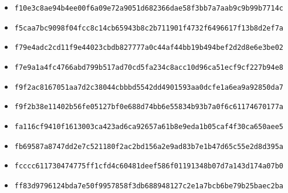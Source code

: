 {\begin{itemize}
    \item \texttt{f10e3c8ae94b4ee00f6a09e72a9051d682366dae58f3bb7a7aab9c9b99b7714c}
    \item \texttt{f5caa7bc9098f04fcc8c14cb65943b8c2b711901f4732f6496617f13b8d2ef7a}
    \item \texttt{f79e4adc2cd11f9e44023cbdb827777a0c44af44bb19b494bef2d2d8e6e3be02}
    \item \texttt{f7e9a1a4fc4766abd799b517ad70cd5fa234c8acc10d96ca51ecf9cf227b94e8}
    \item \texttt{f9f2ac8167051aa7d2c38044cbbbd5542dd4901593aa0dcfe1a6ea9a92850da7}
    \item \texttt{f9f2b38e11402b56fe05127bf0e688d74bb6e55834b93b7a0f6c61174670177a}
    \item \texttt{fa116cf9410f1613003ca423ad6ca92657a61b8e9eda1b05caf4f30ca650aee5}
    \item \texttt{fb69587a8747dd2e7c521180f2ac2bd156a2e9ad83b7e1b47d65c55e2d8d395a}
    \item \texttt{fcccc611730474775ff1cfd4c60481deef586f01191348b07d7a143d174a07b0}
    \item \texttt{ff83d9796124bda7e50f9957858f3db688948127c2e1a7bcb6be79b25baec2ba}
\end{itemize}
}

